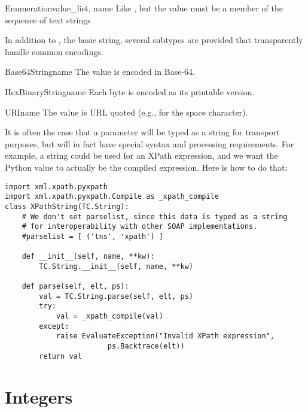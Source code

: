\begin{classdesc}{Enumeration}{value_list, name}
Like , but the value must be a member of
the  sequence of text strings
\end{classdesc}

In addition to ,
the basic string, several subtypes are provided that transparently
handle common encodings.

\begin{classdesc}{Base64String}{name}
The value is encoded in Base-64.
\end{classdesc}

\begin{classdesc}{HexBinaryString}{name}
Each byte is encoded as its printable version.
\end{classdesc}

\begin{classdesc}{URI}{name}
The value is URL quoted (e.g.,  for the space character).
\end{classdesc}

It is often the case that a parameter will be typed as a string for
transport purposes, but will in fact have special syntax and processing
requirements.
For example, a string could be used for an XPath expression, and we want
the Python value to
actually be the compiled expression. Here is how to do that:

\begin{verbatim}
import xml.xpath.pyxpath
import xml.xpath.pyxpath.Compile as _xpath_compile
class XPathString(TC.String):
    # We don't set parselist, since this data is typed as a string
    # for interoperability with other SOAP implementations.
    #parselist = [ ('tns', 'xpath') ]

    def __init__(self, name, **kw):
        TC.String.__init__(self, name, **kw)

    def parse(self, elt, ps):
        val = TC.String.parse(self, elt, ps)
        try:
            val = _xpath_compile(val)
        except:
            raise EvaluateException("Invalid XPath expression",
                        ps.Backtrace(elt))
        return val
\end{verbatim}

\section{Integers}

